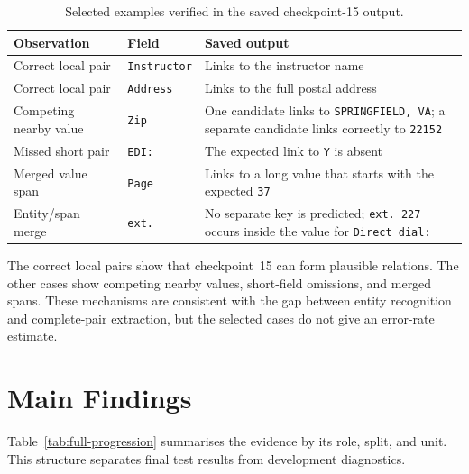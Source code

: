 \begin{table}[ht]
  \centering
  \caption{Selected examples verified in the saved checkpoint-15 output.}
  \label{tab:v4-qualitative-errors}
  \begin{tabular}{@{}
    >{\raggedright\arraybackslash}p{3.3cm}
    >{\raggedright\arraybackslash}p{2.6cm}
    >{\raggedright\arraybackslash}p{9.1cm}
  @{}}
    \toprule
    \textbf{Observation} & \textbf{Field} & \textbf{Saved output} \\
    \midrule
    Correct local pair & \texttt{Instructor} & Links to the instructor name \\
    \addlinespace[2pt]
    Correct local pair & \texttt{Address} & Links to the full postal address \\
    \addlinespace[2pt]
    Competing nearby value & \texttt{Zip} & One candidate links to \texttt{SPRINGFIELD, VA}; a separate candidate links correctly to \texttt{22152} \\
    \addlinespace[2pt]
    Missed short pair & \texttt{EDI:} & The expected link to \texttt{Y} is absent \\
    \addlinespace[2pt]
    Merged value span & \texttt{Page} & Links to a long value that starts with the expected \texttt{37} \\
    \addlinespace[2pt]
    Entity/span merge & \texttt{ext.} & No separate key is predicted; \texttt{ext. 227} occurs inside the value for \texttt{Direct dial:} \\
    \bottomrule
  \end{tabular}
\end{table}

The correct local pairs show that checkpoint~15 can form plausible relations.
The other cases show competing nearby values, short-field omissions, and merged
spans. These mechanisms are consistent with the gap between entity recognition
and complete-pair extraction, but the selected cases do not give an error-rate
estimate.

\section{Main Findings}
\label{sec:narrative-summary}

Table~\ref{tab:full-progression} summarises the evidence by its role, split, and
unit. This structure separates final test results from development diagnostics.

